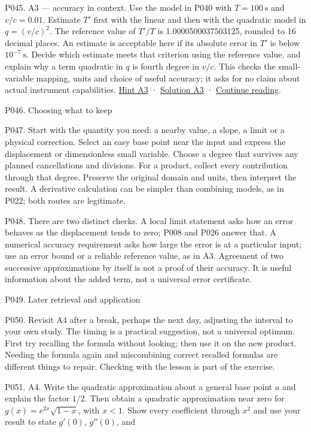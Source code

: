 \documentclass[
  11pt,
]{article}
\providecommand{\lt}{<}
\begin{document}
P045. A3 --- accuracy in context. Use the model in P040 with
\(T=100\ \mathrm{s}\) and \(v/c=0.01\). Estimate \(T'\) first with the
linear and then with the quadratic model in \(q=(v/c)^2\). The reference
value of \(T'/T\) is 1.0000500037503125, rounded to 16 decimal places.
An estimate is acceptable here if its absolute error in \(T'\) is below
\(10^{-7}\ \mathrm{s}\). Decide which estimate meets that criterion
using the reference value, and explain why a term quadratic in \(q\) is
fourth degree in \(v/c\). This checks the small-variable mapping, units
and choice of useful accuracy; it asks for no claim about actual
instrument capabilities. \protect\hyperlink{h3}{Hint A3} ·
\protect\hyperlink{s3}{Solution A3} ·
\protect\hyperlink{after-a3}{Continue reading}.

P046. Choosing what to keep

P047. Start with the quantity you need: a nearby value, a slope, a limit
or a physical correction. Select an easy base point near the input and
express the displacement or dimensionless small variable. Choose a
degree that survives any planned cancellations and divisions. For a
product, collect every contribution through that degree. Preserve the
original domain and units, then interpret the result. A derivative
calculation can be simpler than combining models, as in P022; both
routes are legitimate.

P048. There are two distinct checks. A local limit statement asks how an
error behaves as the displacement tends to zero; P008 and P026 answer
that. A numerical accuracy requirement asks how large the error is at a
particular input; use an error bound or a reliable reference value, as
in A3. Agreement of two successive approximations by itself is not a
proof of their accuracy. It is useful information about the added term,
not a universal error certificate.

P049. Later retrieval and application

P050. Revisit A4 after a break, perhaps the next day, adjusting the
interval to your own study. The timing is a practical suggestion, not a
universal optimum. First try recalling the formula without looking; then
use it on the new product. Needing the formula again and miscombining
correct recalled formulas are different things to repair. Checking with
the lesson is part of the exercise.

P051. A4. Write the quadratic approximation about a general base point
\(a\) and explain the factor \(1/2\). Then obtain a quadratic
approximation near zero for \(g(x)=e^{2x}\sqrt{1-x}\), with \(x\lt 1\).
Show every coefficient through \(x^2\) and use your result to state
\(g'(0)\), \(g''(0)\), and
\end{document}
